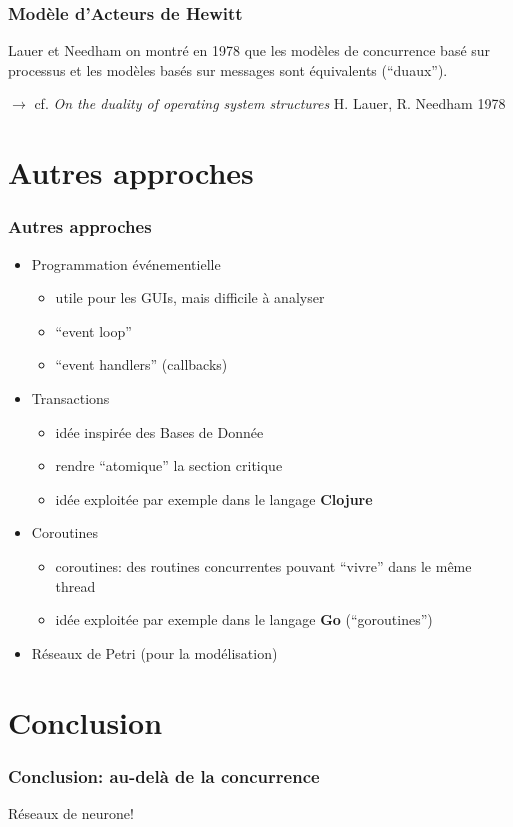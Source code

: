 \documentclass{beamer}
\begin{document}
\begin{frame}[fragile]
  \frametitle{Modèle d'Acteurs de Hewitt}
  Lauer et Needham on montré en 1978 que les modèles de concurrence basé sur
  processus et les modèles basés sur messages sont équivalents (``duaux'').
  \par\bigskip
  \hfill{$\rightarrow$ \footnotesize{}cf. \textit{On the duality of operating system structures}
    H. Lauer, R. Needham 1978}
\end{frame}

\section{Autres approches}
\begin{frame}
  \frametitle{Autres approches}
  \begin{itemize}
  \item{Programmation événementielle} 
  \begin{itemize}
  \item utile pour les GUIs, mais difficile à analyser
  \item ``event loop''
  \item ``event handlers'' (callbacks)
  \end{itemize}
  
  \item{Transactions }
  \begin{itemize}
  \item idée inspirée des Bases de Donnée
  \item rendre ``atomique'' la section critique
  \item idée exploitée par exemple dans le langage \textbf{Clojure}
  \end{itemize}
  
  \item{Coroutines}
  \begin{itemize}
  \item coroutines: des routines concurrentes pouvant ``vivre'' dans le même thread
  \item idée exploitée par exemple dans le langage \textbf{Go} (``goroutines'')
  \end{itemize}

  \item{Réseaux de Petri} (pour la modélisation)
  \end{itemize}
\end{frame}

\section{Conclusion}
\begin{frame}
  \frametitle{Conclusion: au-delà de la concurrence}
  Réseaux de neurone!
\end{frame}
\end{document}
